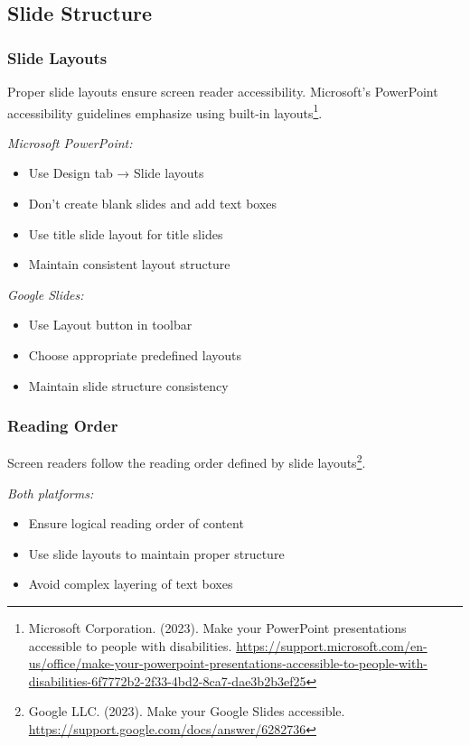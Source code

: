 \subsection{Slide Structure}

\subsubsection{Slide Layouts}
Proper slide layouts ensure screen reader accessibility. Microsoft's PowerPoint accessibility guidelines emphasize using built-in layouts\footnote{Microsoft Corporation. (2023). Make your PowerPoint presentations accessible to people with disabilities. \url{https://support.microsoft.com/en-us/office/make-your-powerpoint-presentations-accessible-to-people-with-disabilities-6f7772b2-2f33-4bd2-8ca7-dae3b2b3ef25}}.

\emph{Microsoft PowerPoint:}
\begin{itemize}
\item Use Design tab → Slide layouts
\item Don't create blank slides and add text boxes
\item Use title slide layout for title slides
\item Maintain consistent layout structure
\end{itemize}

\emph{Google Slides:}
\begin{itemize}
\item Use Layout button in toolbar
\item Choose appropriate predefined layouts
\item Maintain slide structure consistency
\end{itemize}

\subsubsection{Reading Order}
Screen readers follow the reading order defined by slide layouts\footnote{Google LLC. (2023). Make your Google Slides accessible. \url{https://support.google.com/docs/answer/6282736}}.

\emph{Both platforms:}
\begin{itemize}
\item Ensure logical reading order of content
\item Use slide layouts to maintain proper structure
\item Avoid complex layering of text boxes
\end{itemize}

